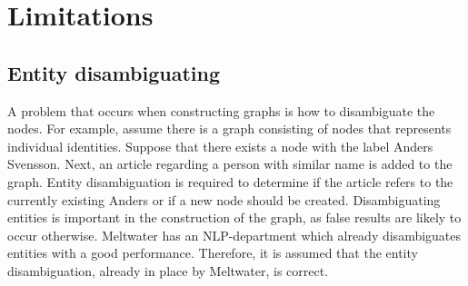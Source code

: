 \section{Limitations}
\subsection{Entity disambiguating}
A problem that occurs when constructing graphs is how to disambiguate the nodes. For example, assume there is a graph consisting of nodes that represents individual identities. Suppose that there exists a node with the label Anders Svensson. Next, an article regarding a person with similar name is added to the graph. Entity disambiguation is required to determine if the article refers to the currently existing Anders or if a new node should be created. Disambiguating entities is important in the construction of the graph, as false results are likely to occur otherwise. Meltwater has an NLP-department which already disambiguates entities with a good performance. Therefore, it is assumed that the entity disambiguation, already in place by Meltwater, is correct. 